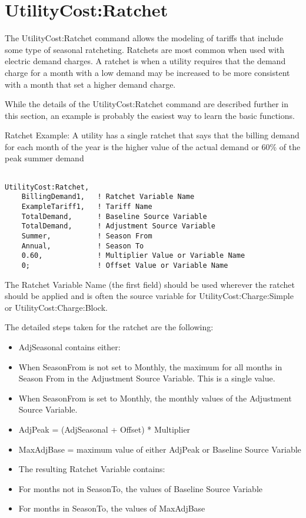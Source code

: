 \section{UtilityCost:Ratchet}\label{utilitycostratchet}

The UtilityCost:Ratchet command allows the modeling of tariffs that include some type of seasonal ratcheting. Ratchets are most common when used with electric demand charges. A ratchet is when a utility requires that the demand charge for a month with a low demand may be increased to be more consistent with a month that set a higher demand charge.

While the details of the UtilityCost:Ratchet command are described further in this section, an example is probably the easiest way to learn the basic functions.

Ratchet Example: A utility has a single ratchet that says that the billing demand for each month of the year is the higher value of the actual demand or 60\% of the peak summer demand

\begin{lstlisting}

UtilityCost:Ratchet,
    BillingDemand1,   ! Ratchet Variable Name
    ExampleTariff1,   ! Tariff Name
    TotalDemand,      ! Baseline Source Variable
    TotalDemand,      ! Adjustment Source Variable
    Summer,           ! Season From
    Annual,           ! Season To
    0.60,             ! Multiplier Value or Variable Name
    0;                ! Offset Value or Variable Name
\end{lstlisting}

The Ratchet Variable Name (the first field) should be used wherever the ratchet should be applied and is often the source variable for UtilityCost:Charge:Simple or UtilityCost:Charge:Block.

The detailed steps taken for the ratchet are the following:

\begin{itemize}
\item
  AdjSeasonal contains either:
\item
  When SeasonFrom is not set to Monthly, the maximum for all months in Season From in the Adjustment Source Variable. This is a single value.
\item
  When SeasonFrom is set to Monthly, the monthly values of the Adjustment Source Variable.
\item
  AdjPeak = (AdjSeasonal + Offset) * Multiplier
\item
  MaxAdjBase = maximum value of either AdjPeak or Baseline Source Variable
\item
  The resulting Ratchet Variable contains:
\item
  For months not in SeasonTo, the values of Baseline Source Variable
\item
  For months in SeasonTo, the values of MaxAdjBase
\end{itemize}

